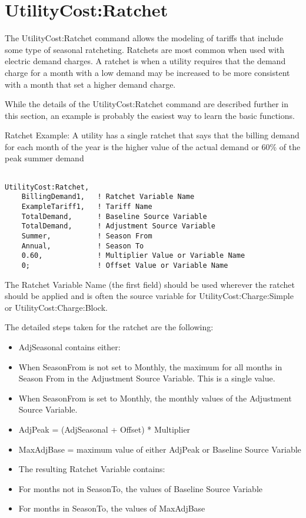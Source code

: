 \section{UtilityCost:Ratchet}\label{utilitycostratchet}

The UtilityCost:Ratchet command allows the modeling of tariffs that include some type of seasonal ratcheting. Ratchets are most common when used with electric demand charges. A ratchet is when a utility requires that the demand charge for a month with a low demand may be increased to be more consistent with a month that set a higher demand charge.

While the details of the UtilityCost:Ratchet command are described further in this section, an example is probably the easiest way to learn the basic functions.

Ratchet Example: A utility has a single ratchet that says that the billing demand for each month of the year is the higher value of the actual demand or 60\% of the peak summer demand

\begin{lstlisting}

UtilityCost:Ratchet,
    BillingDemand1,   ! Ratchet Variable Name
    ExampleTariff1,   ! Tariff Name
    TotalDemand,      ! Baseline Source Variable
    TotalDemand,      ! Adjustment Source Variable
    Summer,           ! Season From
    Annual,           ! Season To
    0.60,             ! Multiplier Value or Variable Name
    0;                ! Offset Value or Variable Name
\end{lstlisting}

The Ratchet Variable Name (the first field) should be used wherever the ratchet should be applied and is often the source variable for UtilityCost:Charge:Simple or UtilityCost:Charge:Block.

The detailed steps taken for the ratchet are the following:

\begin{itemize}
\item
  AdjSeasonal contains either:
\item
  When SeasonFrom is not set to Monthly, the maximum for all months in Season From in the Adjustment Source Variable. This is a single value.
\item
  When SeasonFrom is set to Monthly, the monthly values of the Adjustment Source Variable.
\item
  AdjPeak = (AdjSeasonal + Offset) * Multiplier
\item
  MaxAdjBase = maximum value of either AdjPeak or Baseline Source Variable
\item
  The resulting Ratchet Variable contains:
\item
  For months not in SeasonTo, the values of Baseline Source Variable
\item
  For months in SeasonTo, the values of MaxAdjBase
\end{itemize}

